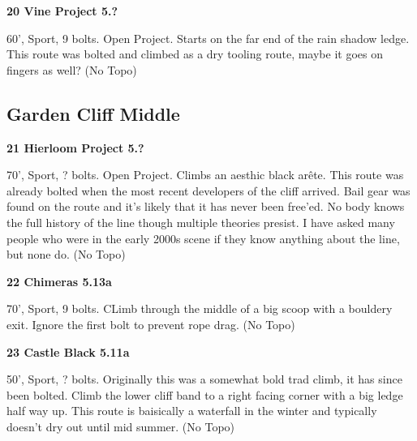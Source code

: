 \begin{multicols}{2}
\needspace{1.5cm}
\label{rt:Vine Project}
\colorbox{black!20}{
\parbox{0.95\linewidth}{
\textbf{
20 Vine Project 5.?  
}}}

\begin{adjustwidth}{0.5cm}{}			
60', Sport, 9 bolts. Open Project. Starts on the far end of the rain shadow ledge. This route was bolted and climbed as a dry tooling route, maybe it goes on fingers as well? (No Topo)
\end{adjustwidth}




\needspace{1.5cm}
\subsection*{Garden Cliff Middle}\label{bf:Garden Cliff Middle}
	


\needspace{1.5cm}
\label{rt:Hierloom Project}
\colorbox{black!20}{
\parbox{0.95\linewidth}{
\textbf{
21 Hierloom Project 5.?  
}}}

\begin{adjustwidth}{0.5cm}{}			
70', Sport, ? bolts. Open Project. Climbs an aesthic black arête. This route was already bolted when the most recent developers of the cliff arrived. Bail gear was found on the route and it's likely that it has never been free'ed. No body knows the full history of the line though multiple theories presist. I have asked many people who were in the early 2000s scene if they know anything about the line, but none do. (No Topo)
\end{adjustwidth}



\needspace{1.5cm}
\label{rt:Chimeras}
\colorbox{Goldenrod!50}{
\parbox{0.95\linewidth}{
\textbf{
22 Chimeras 5.13a  
}}}

\begin{adjustwidth}{0.5cm}{}			
70', Sport, 9 bolts. CLimb through the middle of a big scoop with a bouldery exit. Ignore the first bolt to prevent rope drag. (No Topo)
\end{adjustwidth}



\needspace{1.5cm}
\label{rt:Castle Black}
\colorbox{RoyalBlue!20}{
\parbox{0.95\linewidth}{
\textbf{
23 Castle Black 5.11a  
}}}

\begin{adjustwidth}{0.5cm}{}			
50', Sport, ? bolts. Originally this was a somewhat bold trad climb, it has since been bolted. Climb the lower cliff band to a right facing corner with a big ledge half way up. This route is baisically a waterfall in the winter and typically doesn't dry out until mid summer. (No Topo)
\end{adjustwidth}




\end{multicols}
